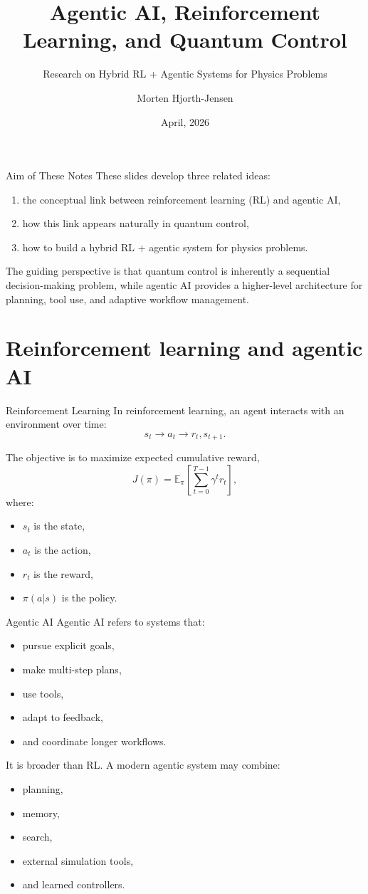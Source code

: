 \documentclass[aspectratio=169]{beamer}
\title{Agentic AI, Reinforcement Learning, and Quantum Control}
\subtitle{Research on Hybrid RL + Agentic Systems for Physics Problems}
\author{Morten Hjorth-Jensen}
\date{April, 2026}
\begin{document}
\frame{\titlepage}

\begin{frame}{Aim of These Notes}
These slides develop three related ideas:
\begin{enumerate}
    \item the conceptual link between reinforcement learning (RL) and agentic AI,
    \item how this link appears naturally in quantum control,
    \item how to build a hybrid RL + agentic system for physics problems.
\end{enumerate}

\medskip

The guiding perspective is that quantum control is inherently a sequential decision-making problem, while agentic AI provides a higher-level architecture for planning, tool use, and adaptive workflow management.
\end{frame}

\section{Reinforcement learning and agentic AI}

\begin{frame}{Reinforcement Learning}
In reinforcement learning, an agent interacts with an environment over time:
\[
s_t \rightarrow a_t \rightarrow r_t, s_{t+1}.
\]

The objective is to maximize expected cumulative reward,
\[
J(\pi)=\mathbb{E}_\pi\left[\sum_{t=0}^{T-1}\gamma^t r_t\right],
\]
where:
\begin{itemize}
    \item \(s_t\) is the state,
    \item \(a_t\) is the action,
    \item \(r_t\) is the reward,
    \item \(\pi(a|s)\) is the policy.
\end{itemize}
\end{frame}

\begin{frame}{Agentic AI}
Agentic AI refers to systems that:
\begin{itemize}
    \item pursue explicit goals,
    \item make multi-step plans,
    \item use tools,
    \item adapt to feedback,
    \item and coordinate longer workflows.
\end{itemize}

It is broader than RL. A modern agentic system may combine:
\begin{itemize}
    \item planning,
    \item memory,
    \item search,
    \item external simulation tools,
    \item and learned controllers.
\end{itemize}
\end{frame}
\end{document}
